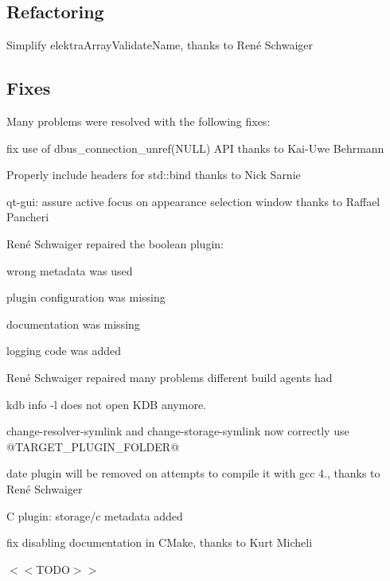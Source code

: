 \subsection*{Refactoring}


\begin{DoxyItemize}
\item Simplify {\ttfamily elektra\+Array\+Validate\+Name}, thanks to René Schwaiger
\end{DoxyItemize}

\subsection*{Fixes}

Many problems were resolved with the following fixes\+:


\begin{DoxyItemize}
\item fix use of {\ttfamily dbus\+\_\+connection\+\_\+unref(\+N\+U\+L\+L)} A\+PI thanks to Kai-\/\+Uwe Behrmann
\item Properly include headers for {\ttfamily std\+::bind} thanks to Nick Sarnie
\item qt-\/gui\+: assure active focus on appearance selection window thanks to Raffael Pancheri
\item René Schwaiger repaired the {\ttfamily boolean} plugin\+:
\begin{DoxyItemize}
\item wrong metadata was used
\item plugin configuration was missing
\item documentation was missing
\item logging code was added
\end{DoxyItemize}
\item René Schwaiger repaired many problems different build agents had
\item {\ttfamily kdb info -\/l} does not open {\ttfamily K\+DB} anymore.
\item {\ttfamily change-\/resolver-\/symlink} and {\ttfamily change-\/storage-\/symlink} now correctly use {\ttfamily @T\+A\+R\+G\+E\+T\+\_\+\+P\+L\+U\+G\+I\+N\+\_\+\+F\+O\+L\+D\+ER@}
\item date plugin will be removed on attempts to compile it with gcc 4., thanks to René Schwaiger
\item C plugin\+: storage/c metadata added
\item fix disabling documentation in C\+Make, thanks to Kurt Micheli
\item $<$$<$\+T\+O\+D\+O$>$$>$
\end{DoxyItemize}

